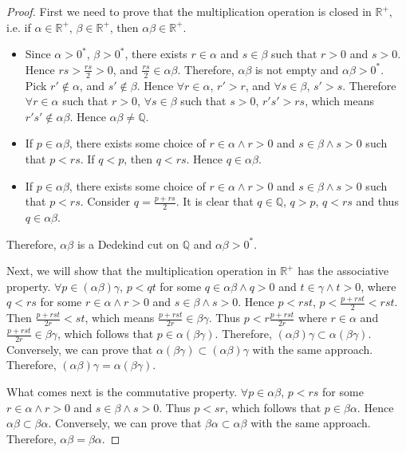 \documentclass[onecolumn]{article}
\begin{document}
\begin{proof}
  First we need to prove that the multiplication operation is closed in 
  $\mathbb{R^+}$, i.e. if $\alpha \in \mathbb{R^+}$, $\beta \in \mathbb{R^+}$, 
  then $\alpha \beta \in \mathbb{R^+}$.
  \begin{itemize}
    \item Since $\alpha > 0^*$, $\beta > 0^*$, there exists $r \in \alpha$ and 
    $s \in \beta$ such that $r > 0$ and $s > 0$. Hence $rs > \frac{rs}{2} > 0$, 
    and $\frac{rs}{2} \in \alpha \beta$. Therefore, $\alpha \beta$ is not empty 
    and $\alpha \beta > 0^*$. Pick $r' \notin \alpha$, and $s' \notin \beta$. 
    Hence $\forall r \in \alpha$, $r' > r$, and $\forall s \in \beta$, $s' > s$. 
    Therefore $\forall r \in \alpha$ such that $r > 0$, $\forall s \in \beta$ 
    such that $s > 0$, $r's' > rs$, which means $r's' \notin \alpha \beta$. 
    Hence $\alpha \beta \neq \mathbb{Q}$.
    \item If $p \in \alpha \beta$, there exists some choice of 
    $r \in \alpha \wedge r > 0$ and $s \in \beta \wedge s > 0$ such that $p < rs$. 
    If $q < p$, then $q < rs$. Hence $q \in \alpha \beta$.
    \item If $p \in \alpha \beta$, there exists some choice of 
    $r \in \alpha \wedge r > 0$ and $s \in \beta \wedge s > 0$ such that $p < rs$.
    Consider $q = \frac{p + rs}{2}$. It is clear that $q \in \mathbb{Q}$, 
    $q > p$, $q < rs$ and thus $q \in \alpha \beta$.
  \end{itemize}
  Therefore, $\alpha \beta$ is a Dedekind cut on $\mathbb{Q}$ and 
  $\alpha \beta > 0^*$.

  Next, we will show that the multiplication operation in $\mathbb{R^+}$ has the 
  associative property. $\forall p \in (\alpha \beta) \gamma$, $p < qt$ for some 
  $q \in \alpha \beta \wedge q > 0$ and $t \in \gamma \wedge t > 0$, where 
  $q < rs$ for some $r \in \alpha \wedge r > 0$ and $s \in \beta \wedge s > 0$. 
  Hence $p < rst$, $p < \frac{p + rst}{2} < rst$. Then $\frac{p + rst}{2r} < st$, 
  which means $\frac{p + rst}{2r} \in \beta \gamma$. Thus 
  $p < r \frac{p + rst}{2r}$ where $r \in \alpha$ and 
  $\frac{p + rst}{2r} \in \beta \gamma$, which follows that 
  $p \in \alpha (\beta \gamma)$. Therefore, 
  $(\alpha \beta) \gamma \subset \alpha (\beta \gamma)$. Conversely, we can 
  prove that $\alpha (\beta \gamma) \subset (\alpha \beta) \gamma$ with the same 
  approach. Therefore, $(\alpha \beta) \gamma = \alpha (\beta \gamma)$.

  What comes next is the commutative property. $\forall p \in \alpha \beta$, 
  $p < rs$ for some $r \in \alpha \wedge r > 0$ and $s \in \beta \wedge s > 0$. 
  Thus $p < sr$, which follows that $p \in \beta \alpha$. Hence
  $\alpha \beta \subset \beta \alpha$. Conversely, we can prove that 
  $\beta \alpha \subset \alpha \beta$ with the same approach. Therefore, 
  $\alpha \beta = \beta \alpha$.


\end{proof}
\end{document}
